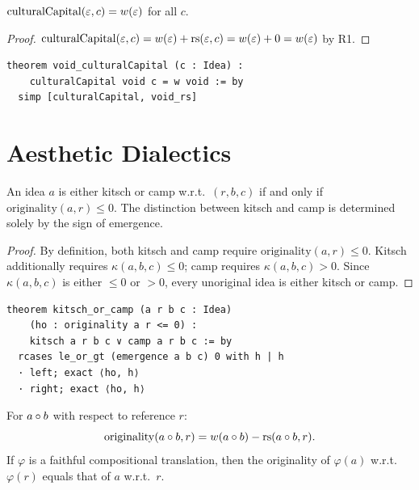 \begin{theorem}
\label{thm:void-capital}
$\mathrm{culturalCapital}(\varepsilon, c) = w(\varepsilon)$ for all $c$.
\end{theorem}

\begin{proof}
$\mathrm{culturalCapital}(\varepsilon, c) = w(\varepsilon) + \mathrm{rs}(\varepsilon, c) = w(\varepsilon) + 0
= w(\varepsilon)$ by R1.
\end{proof}

\begin{lstlisting}
theorem void_culturalCapital (c : Idea) :
    culturalCapital void c = w void := by
  simp [culturalCapital, void_rs]
\end{lstlisting}

\section{Aesthetic Dialectics}
\label{sec:adorno:dialectics}

\begin{theorem}
\label{thm:kitsch-camp-comp}
An idea $a$ is either kitsch or camp w.r.t.\ $(r, b, c)$ if and only if
$\mathrm{originality}(a, r) \leq 0$.  The distinction between kitsch and
camp is determined solely by the sign of emergence.
\end{theorem}

\begin{proof}
By definition, both kitsch and camp require $\mathrm{originality}(a, r) \leq 0$.
Kitsch additionally requires $\kappa(a, b, c) \leq 0$; camp requires
$\kappa(a, b, c) > 0$.  Since $\kappa(a, b, c)$ is either $\leq 0$ or $> 0$,
every unoriginal idea is either kitsch or camp.
\end{proof}

\begin{lstlisting}
theorem kitsch_or_camp (a r b c : Idea)
    (ho : originality a r <= 0) :
    kitsch a r b c ∨ camp a r b c := by
  rcases le_or_gt (emergence a b c) 0 with h | h
  · left; exact ⟨ho, h⟩
  · right; exact ⟨ho, h⟩
\end{lstlisting}

\begin{theorem}
\label{thm:originality-compose}
For $a \circ b$ with respect to reference $r$:
\[
  \mathrm{originality}(a \circ b, r) = w(a \circ b) - \mathrm{rs}(a \circ b, r).
\]
If $\varphi$ is a faithful compositional translation, then the originality
of $\varphi(a)$ w.r.t.\ $\varphi(r)$ equals that of $a$ w.r.t.\ $r$.
\end{theorem}

